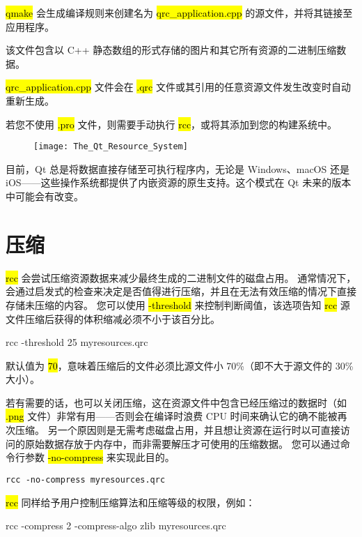 \hl{qmake} 会生成编译规则来创建名为 \hl{qrc\_application.cpp} 的源文件，并将其链接至应用程序。

该文件包含以 C++ 静态数组的形式存储的图片和其它所有资源的二进制压缩数据。

\hl{qrc\_application.cpp} 文件会在 \hl{.qrc} 文件或其引用的任意资源文件发生改变时自动重新生成。

若您不使用 \hl{.pro} 文件，则需要手动执行 \hl{rcc}，或将其添加到您的构建系统中。

\begin{figure}[hbt!]  
	\centering
    \texttt{[image: The\_Qt\_Resource\_System]}
\end{figure}

目前，Qt 总是将数据直接存储至可执行程序内，无论是 Windows、macOS 还是 iOS——这些操作系统都提供了内嵌资源的原生支持。这个模式在 Qt 未来的版本中可能会有改变。

\section{压缩}

\hl{rcc} 会尝试压缩资源数据来减少最终生成的二进制文件的磁盘占用。
通常情况下，会通过启发式的检查来决定是否值得进行压缩，并且在无法有效压缩的情况下直接存储未压缩的内容。
您可以使用 \hl{-threshold} 来控制判断阈值，该选项告知 \hl{rcc} 源文件压缩后获得的体积缩减必须不小于该百分比。

\begin{cppcode}   
rcc -threshold 25 myresources.qrc
\end{cppcode}

默认值为 \hl{70}，意味着压缩后的文件必须比源文件小 70\%（即不大于源文件的 30\% 大小）。

若有需要的话，也可以关闭压缩，这在资源文件中包含已经压缩过的数据时（如 \hl{.png} 文件）非常有用——否则会在编译时浪费 CPU 时间来确认它的确不能被再次压缩。
另一个原因则是无需考虑磁盘占用，并且想让资源在运行时以可直接访问的原始数据存放于内存中，而非需要解压才可使用的压缩数据。
您可以通过命令行参数 \hl{-no-compress} 来实现此目的。

\begin{lstlisting}   
rcc -no-compress myresources.qrc
\end{lstlisting}

\hl{rcc} 同样给予用户控制压缩算法和压缩等级的权限，例如：

\begin{cppcode}   
rcc -compress 2 -compress-algo zlib myresources.qrc
\end{cppcode}

